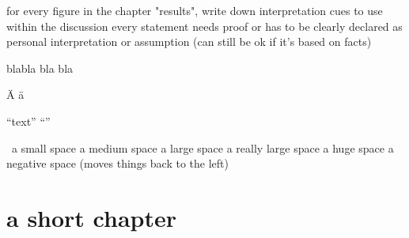







\usepackage{geometry}
\geometry{verbose,a4paper,tmargin=30mm,bmargin=30mm,lmargin=30mm,rmargin=30mm}
\geometry{landscape} 		%


\newpage
\thispagestyle{empty}
\mbox{}


\setlength{\parindent}{0pt}				%
\setlength{\parskip}\medskipamount		%




for every figure in the chapter "results", write down interpretation cues to use within the discussion
every statement needs proof or has to be clearly declared as personal interpretation or assumption (can still be ok if it's based on facts)


\tiny
\scriptsize
\footnotesize
\small
\normalsize
\large
\Large
\LARGE
\huge
\Huge

{ \large blabla bla
bla}


\"{A}
\"{a}


``text''
``''

\usepackage{lipsum}
\lipsum[1]
\lipsum


\, 	a small space
\: 	a medium space
\; 	a large space
\quad 	a really large space
\qquad 	a huge space
\! 	a negative space (moves things back to the left)


\begingroup

\let\clearpage\relax

\chapter{a short chapter}

